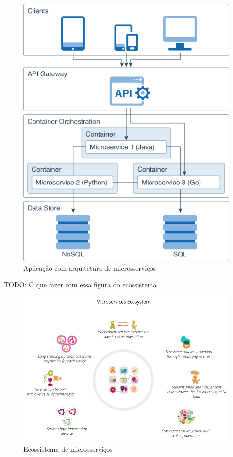\begin{figure}[htb]
	\caption{\label{figura_arquitetura_microsservicos}Aplicação com arquitetura de microsserviços}
	\begin{center}
	    \includegraphics[scale=0.5]{Imagens/microservice_architecture.png}
	\end{center}
\end{figure}

TODO: O que fazer com essa figura do ecossistema

\begin{figure}[htb]
	\caption{\label{figura_ecossistema_microsservicos}Ecossistema de microsserviços}
	\begin{center}
	    \includegraphics[scale=0.5]{Imagens/ecosystem.png}
	\end{center}
\end{figure}

